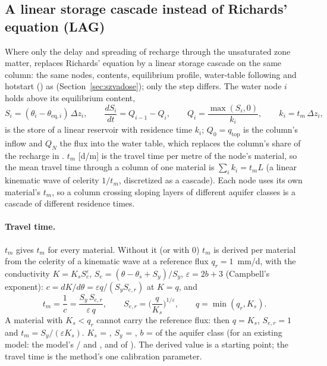 \subsection{A linear storage cascade instead of Richards' equation (LAG)}\label{sec:szvadoselag}
Where only the delay and spreading of recharge through the unsaturated zone matter,  replaces
Richards' equation by a linear storage cascade on the same column: the same nodes, contents, equilibrium profile,
water-table following and hotstart () as  (Section~\ref{sec:szvadose}); only the
step differs. The water node $i$ holds above its equilibrium content,
\begin{equation}
S_i=(\theta_i-\theta_{\mathrm{eq},i})\,\Delta z_i,\qquad \frac{dS_i}{dt}=Q_{i-1}-Q_i,\qquad Q_i=\frac{\max(S_i,0)}{k_i},\qquad k_i=t_m\,\Delta z_i,
\end{equation}
is the store of a linear reservoir with residence time $k_i$; $Q_0=q_{\mathrm{top}}$ is the column's inflow and $Q_N$ the
flux into the water table, which replaces the column's share of the recharge in . $t_m$ [d/m] is the travel
time per metre of the node's material, so the mean travel time through a column of one material is $\sum_ik_i=t_mL$ (a
linear kinematic wave of celerity $1/t_m$, discretized as a cascade). Each node uses its own material's $t_m$, so a
column crossing sloping layers of different aquifer classes is a cascade of different residence times.

\paragraph{Travel time.}  $t_m$ gives $t_m$ for every material. Without it (or with 0) $t_m$
is derived per material from the celerity of a kinematic wave at a reference flux $q_r=1$~mm/d, with the conductivity
$K=K_sS_e^{\varepsilon}$, $S_e=(\theta-\theta_s+S_y)/S_y$, $\varepsilon=2b+3$ (Campbell's exponent):
$c=dK/d\theta=\varepsilon q/(S_yS_{e,r})$ at $K=q$, and
\begin{equation}\label{eq:lagtm}
t_m=\frac1c=\frac{S_y\,S_{e,r}}{\varepsilon\,q},\qquad S_{e,r}=\Big(\frac{q}{K_s}\Big)^{1/\varepsilon},\qquad q=\min(q_r,K_s).
\end{equation}
A material with $K_s<q_r$ cannot carry the reference flux: then $q=K_s$, $S_{e,r}=1$ and $t_m=S_y/(\varepsilon K_s)$. $K_s$ =
, $S_y$ = , $b$ =  of the aquifer class (for an existing model: the model's
/ and , and  of ). The derived value is a starting point;
the travel time is the method's one calibration parameter.

